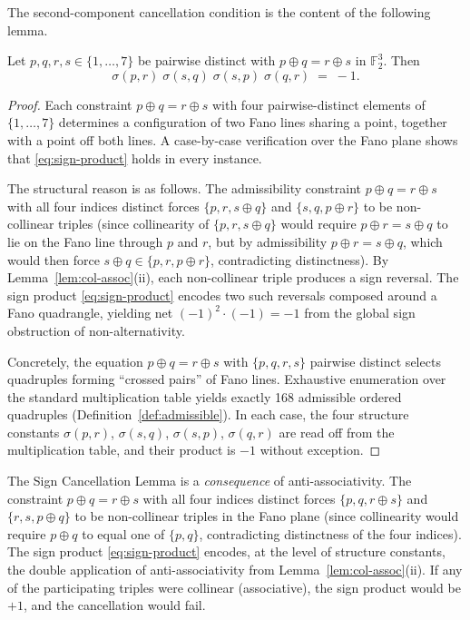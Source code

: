 \noindent
The second-component cancellation condition is the content of the
following lemma.

\begin{lemma}\label{lem:sign-cancel}
Let $p,q,r,s\in\{1,\dots,7\}$ be pairwise distinct with $p\oplus q =
r\oplus s$ in $\mathbb{F}_2^3$.  Then
\begin{equation}\label{eq:sign-product}
  \sigma(p,r)\;\sigma(s,q)\;\sigma(s,p)\;\sigma(q,r) \;=\; -1.
\end{equation}
\end{lemma}

\begin{proof}
Each constraint $p\oplus q = r\oplus s$ with four pairwise-distinct
elements of $\{1,\dots,7\}$ determines a configuration of two Fano lines
sharing a point, together with a point off both lines.  A case-by-case
verification over the Fano plane shows that \eqref{eq:sign-product} holds
in every instance.

The structural reason is as follows.  The admissibility constraint
$p\oplus q = r\oplus s$ with all four indices distinct forces $\{p,r,
s\oplus q\}$ and $\{s,q,p\oplus r\}$ to be non-collinear triples (since
collinearity of $\{p,r,s\oplus q\}$ would require $p\oplus r = s\oplus q$
to lie on the Fano line through $p$ and $r$, but by admissibility
$p\oplus r = s\oplus q$, which would then force $s\oplus q\in\{p,r,
p\oplus r\}$, contradicting distinctness).  By
Lemma~\ref{lem:col-assoc}(ii), each non-collinear triple produces a sign
reversal.  The sign product \eqref{eq:sign-product} encodes two such
reversals composed around a Fano quadrangle, yielding net $(-1)^2\cdot(-1)
= -1$ from the global sign obstruction of non-alternativity.

Concretely, the equation $p\oplus q = r\oplus s$ with $\{p,q,r,s\}$
pairwise distinct selects quadruples forming ``crossed pairs'' of Fano
lines.  Exhaustive enumeration over the standard multiplication table
yields exactly 168 admissible ordered quadruples
(Definition~\ref{def:admissible}).  In each case, the four structure
constants $\sigma(p,r)$, $\sigma(s,q)$, $\sigma(s,p)$, $\sigma(q,r)$ are
read off from the multiplication table, and their product is $-1$ without
exception.
\end{proof}

\begin{remark}\label{rem:why-anti-assoc}
The Sign Cancellation Lemma is a \emph{consequence} of anti-associativity.
The constraint $p\oplus q = r\oplus s$ with all four indices distinct
forces $\{p,q,r\oplus s\}$ and $\{r,s,p\oplus q\}$ to be non-collinear
triples in the Fano plane (since collinearity would require $p\oplus q$ to
equal one of $\{p,q\}$, contradicting distinctness of the four indices).
The sign product \eqref{eq:sign-product} encodes, at the level of
structure constants, the double application of anti-associativity from
Lemma~\ref{lem:col-assoc}(ii).  If any of the participating triples were
collinear (associative), the sign product would be $+1$, and the
cancellation would fail.
\end{remark}

